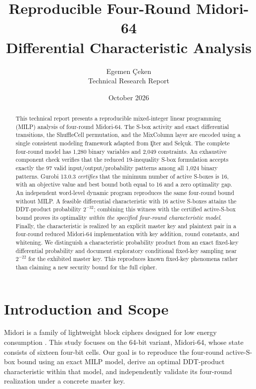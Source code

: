 \documentclass[11pt,a4paper]{article}
\title{\vspace{-1.2cm}\bfseries Reproducible Four-Round Midori-64\\[4pt]\large Differential Characteristic Analysis}
\author{Egemen \c{C}eken\\\small Technical Research Report}
\date{October 2026}
\begin{document}
\maketitle
\vspace{-1.1cm}
\begin{abstract}
This technical report presents a reproducible mixed-integer linear programming (MILP) analysis of four-round
Midori-64. The S-box activity and exact differential transitions, the ShuffleCell
permutation, and the MixColumn layer are encoded using a single consistent modeling
framework adapted from \c{I}lter and Sel\c{c}uk. The complete four-round model has
1,280 binary variables and 2,049 constraints. An exhaustive component check verifies
that the reduced 19-inequality S-box formulation accepts exactly the 97 valid
input/output/probability patterns among all 1,024 binary patterns.
Gurobi 13.0.3 \emph{certifies} that the minimum number of active S-boxes is 16,
with an objective value and best bound both equal to 16 and a zero optimality gap.
An independent word-level dynamic program reproduces the same four-round bound without MILP. A feasible differential characteristic with 16 active S-boxes attains the
DDT-product probability $2^{-32}$; combining this witness with the certified
active-S-box bound proves its optimality \emph{within the specified four-round
characteristic model}. Finally, the characteristic is realized by an explicit
master key and plaintext pair in a four-round reduced Midori-64 implementation
with key addition, round constants, and whitening. We distinguish a
characteristic probability product from an exact fixed-key differential probability
and document exploratory conditional fixed-key sampling near $2^{-22}$ for the exhibited master key. This reproduces known fixed-key phenomena rather than claiming a new security bound for the full cipher.
\end{abstract}

\section{Introduction and Scope}
Midori is a family of lightweight block ciphers designed for low energy
consumption \cite{banik2015}. This study focuses on the 64-bit variant,
Midori-64, whose state consists of sixteen four-bit cells. Our goal is to reproduce the four-round active-S-box bound using an exact MILP model,
derive an optimal DDT-product characteristic within that model, and independently
validate its four-round realization under a concrete master key.
\end{document}
